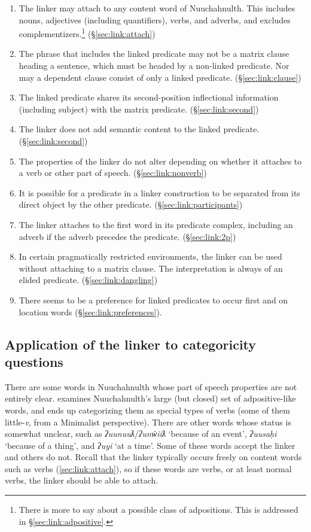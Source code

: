 \begin{enumerate}
	\item The linker may attach to any content word of Nuuchahnulth. This includes nouns, adjectives (including quantifiers), verbs, and adverbs, and excludes complementizers.\footnote{There is more to say about a possible class of adpositions. This is addressed in \S\ref{sec:link:adpositive}.} (\S\ref{sec:link:attach})
	\item The phrase that includes the linked predicate may not be a matrix clause heading a sentence, which must be headed by a non-linked predicate. Nor may a dependent clause consist of only a linked predicate. (\S\ref{sec:link:clause})
	\item The linked predicate shares its second-position inflectional information (including subject) with the matrix predicate. (\S\ref{sec:link:second})
	\item The linker does not add semantic content to the linked predicate. (\S\ref{sec:link:second})
	\item The properties of the linker do not alter depending on whether it attaches to a verb or other part of speech. (\S\ref{sec:link:nonverb})
	\item It is possible for a predicate in a linker construction to be separated from its direct object by the other predicate. (\S\ref{sec:link:participants})
	\item The linker attaches to the first word in its predicate complex, including an adverb if the adverb precedes the predicate. (\S\ref{sec:link:2p})
	\item In certain pragmatically restricted environments, the linker can be used without attaching to a matrix clause. The interpretation is always of an elided predicate. (\S\ref{sec:link:dangling})
	\item There seems to be a preference for linked predicates to occur first and on location words (\S\ref{sec:link:preferences}).
\end{enumerate}

\subsection{Application of the linker to categoricity questions} \label{sec:link:application}

There are some words in Nuuchahnulth whose part of speech properties are not entirely clear. \cite{woo2007b} examines Nuuchahnulth's large (but closed) set of adpositive-like words, and ends up categorizing them as special types of verbs (some of them little-\textit{v}, from a Minimalist perspective). There are other words whose status is somewhat unclear, such as \textit{ʔuunuuƛ}/\textit{ʔunw̓iiƛ} `because of an event', \textit{ʔuusaḥi} `because of a thing', and \textit{ʔuyi} `at a time'. Some of these words accept the linker and others do not. Recall that the linker typically occurs freely on content words such as verbs (\ref{sec:link:attach}), so if these words are verbs, or at least normal verbs, the linker should be able to attach.

